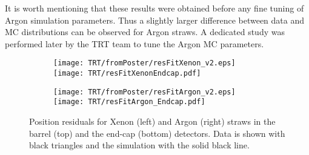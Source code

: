 It is worth mentioning that these results were obtained before any fine tuning of Argon simulation parameters. Thus a slightly larger difference between data and MC distributions can be observed for Argon straws. A dedicated study was performed later by the TRT team to tune the Argon MC parameters.

\begin{figure}[h]

\begin{subfigure}{.5\textwidth}
  \centering
  \texttt{[image: TRT/fromPoster/resFitXenon\_v2.eps]}
  \texttt{[image: TRT/resFitXenonEndcap.pdf]}
\end{subfigure}%
\begin{subfigure}{.5\textwidth}
  \centering
  \texttt{[image: TRT/fromPoster/resFitArgon\_v2.eps]}
  \texttt{[image: TRT/resFitArgon\_Endcap.pdf]}
\end{subfigure}

\caption{Position residuals for Xenon (left) and Argon (right) straws in the barrel (top) and the end-cap (bottom) detectors. Data is shown with black triangles and the
simulation with the solid black line.}
  \label{fig:resFit}
\end{figure}


